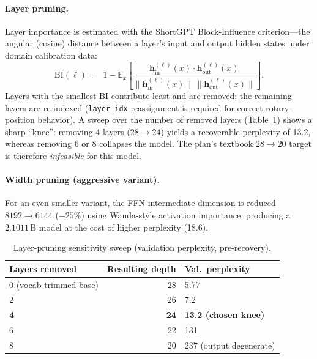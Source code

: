 \documentclass[11pt,a4paper]{article}
\newcommand{\param}[1]{\ensuremath{#1\,\text{B}}}
\begin{document}
\paragraph{Layer pruning.} Layer importance is estimated with the ShortGPT
Block-Influence criterion---the angular (cosine) distance between a layer's
input and output hidden states under domain calibration data:
\begin{equation}
  \mathrm{BI}(\ell) \;=\; 1 - \mathbb{E}_{x}\!\left[
  \frac{\mathbf{h}^{(\ell)}_{\text{in}}(x)\cdot
        \mathbf{h}^{(\ell)}_{\text{out}}(x)}
       {\lVert \mathbf{h}^{(\ell)}_{\text{in}}(x)\rVert\,
        \lVert \mathbf{h}^{(\ell)}_{\text{out}}(x)\rVert}\right].
  \label{eq:bi}
\end{equation}
Layers with the smallest $\mathrm{BI}$ contribute least and are removed; the
remaining layers are re-indexed (\texttt{layer\_idx} reassignment is required
for correct rotary-position behavior). A sweep over the number of removed
layers (Table~\ref{tab:sweep}) shows a sharp ``knee'': removing 4 layers
($28{\to}24$) yields a recoverable perplexity of 13.2, whereas removing 6 or
8 collapses the model. The plan's textbook $28{\to}20$ target is therefore
\emph{infeasible} for this model.

\paragraph{Width pruning (aggressive variant).} For an even smaller variant,
the FFN intermediate dimension is reduced $8192 \to 6144$ ($-25\%$) using
Wanda-style activation importance, producing a \param{2.1011} model at the
cost of higher perplexity (18.6).

\begin{table}[H]
  \centering
  \caption{Layer-pruning sensitivity sweep (validation perplexity, pre-recovery).}
  \label{tab:sweep}
  \begin{tabular}{lrl}
    \toprule
    \textbf{Layers removed} & \textbf{Resulting depth} & \textbf{Val.\ perplexity} \\
    \midrule
    0 (vocab-trimmed base) & 28 & 5.77 \\
    2  & 26 & 7.2 \\
    \textbf{4} & \textbf{24} & \textbf{13.2 \;(chosen knee)} \\
    6  & 22 & 131 \\
    8  & 20 & 237 \;(output degenerate) \\
    \bottomrule
  \end{tabular}
\end{table}
\end{document}
